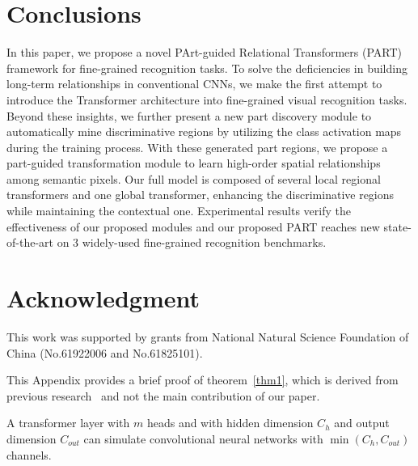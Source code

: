 \documentclass[journal]{IEEEtran}
\begin{document}
\section{Conclusions}\label{sec:conclusion}
In this paper, we propose a novel PArt-guided Relational Transformers (PART) framework for fine-grained recognition tasks. To solve the deficiencies in building long-term relationships in conventional CNNs, we make the first attempt to introduce the Transformer architecture into fine-grained visual recognition tasks. Beyond these insights, we further present a new part discovery module to automatically mine discriminative regions by utilizing the class activation maps during the training process. With these generated part regions, we propose a part-guided transformation module to learn high-order spatial relationships among semantic pixels. Our full model is composed of several local regional transformers and one global transformer, enhancing the discriminative regions while maintaining the contextual one. Experimental results verify the effectiveness of our proposed modules and our proposed PART reaches new state-of-the-art on 3 widely-used fine-grained recognition benchmarks.




















\section*{Acknowledgment}
This work was supported by grants from National Natural Science Foundation of China (No.61922006 and No.61825101).

\ifCLASSOPTIONcaptionsoff
  \newpage
\fi













 \label{sec:appendix}
This Appendix provides a brief proof of theorem~\ref{thm1}, which is derived from previous research~\cite{cordonnier2020relationship} and not the main contribution of our paper.

\begin{thm}
A transformer layer with $m$ heads and with hidden dimension $C_h$ and output dimension $C_{out}$ can simulate convolutional neural networks with $\min(C_h, C_{out})$ channels.
\end{thm}
\end{document}
